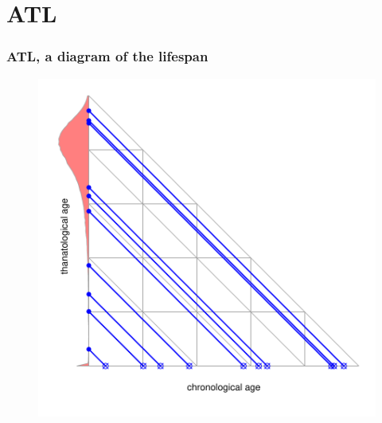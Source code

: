 \documentclass[20pt]{beamer}
\begin{document}
\section{ATL}
\begin{frame}
\frametitle{ATL, a diagram of the lifespan}
\begin{figure}[b]
    \centering
    \includegraphics{Figures/LabPres/ATL3.pdf}
\end{figure} 
\end{frame}
\end{document}
